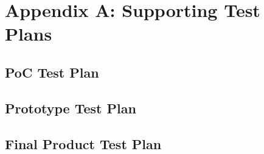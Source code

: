 

\setcounter{section}{8}
\section{Appendix A: Supporting Test Plans}
\bigskip


\subsection*{PoC Test Plan}

\subsection*{Prototype Test Plan}

\subsection*{Final Product Test Plan}